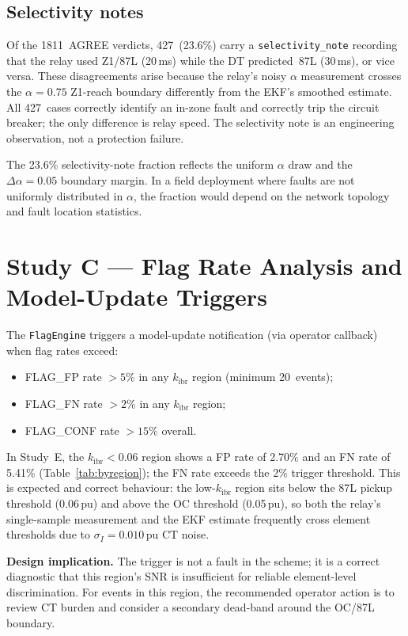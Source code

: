 \documentclass[11pt,a4paper]{article}
\newcommand{\kibr}{k_\mathrm{ibr}}
\begin{document}
\subsection{Selectivity notes}

Of the 1811~AGREE verdicts, 427~(23.6\%) carry a \texttt{selectivity\_note}
recording that the relay used Z1/87L (20\,ms) while the DT predicted~87L
(30\,ms), or vice versa.  These disagreements arise because the relay's noisy
$\alpha$ measurement crosses the $\alpha = 0.75$ Z1-reach boundary
differently from the EKF's smoothed estimate.  All 427~cases correctly identify
an in-zone fault and correctly trip the circuit breaker; the only difference is
relay speed.  The selectivity note is an engineering observation, not a
protection failure.

The 23.6\% selectivity-note fraction reflects the uniform $\alpha$ draw and the
$\Delta\alpha = 0.05$ boundary margin.  In a field deployment where faults are
not uniformly distributed in $\alpha$, the fraction would depend on the network
topology and fault location statistics.

\section{Study C --- Flag Rate Analysis and Model-Update Triggers}
\label{sec:studyC}

The \texttt{FlagEngine} triggers a model-update notification (via operator
callback) when flag rates exceed:
\begin{itemize}
  \item FLAG\_FP rate $> 5\%$ in any $\kibr$ region (minimum 20~events);
  \item FLAG\_FN rate $> 2\%$ in any $\kibr$ region;
  \item FLAG\_CONF rate $> 15\%$ overall.
\end{itemize}

In Study~E, the $\kibr < 0.06$ region shows a FP rate of 2.70\% and an FN
rate of 5.41\% (Table~\ref{tab:byregion}); the FN rate exceeds the 2\%
trigger threshold.  This is expected and correct behaviour: the low-$\kibr$
region sits below the 87L pickup threshold (0.06\,pu) and above the OC
threshold (0.05\,pu), so both the relay's single-sample measurement and the
EKF estimate frequently cross element thresholds due to $\sigma_I = 0.010$\,pu
CT noise.

\noindent\textbf{Design implication.}
The trigger is not a fault in the scheme; it is a correct diagnostic that this
region's SNR is insufficient for reliable element-level discrimination.
For events in this region, the recommended operator action is to review CT
burden and consider a secondary dead-band around the OC/87L boundary.
\end{document}

